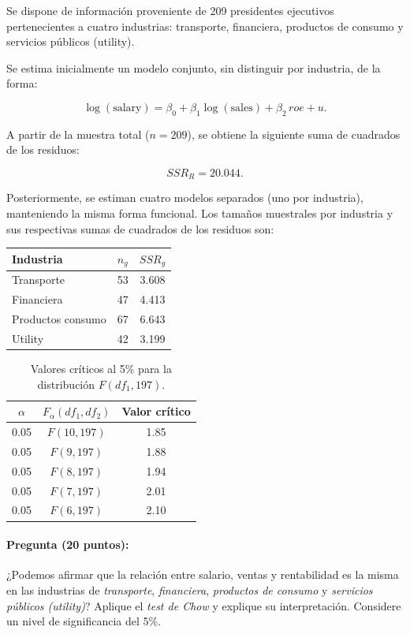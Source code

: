 \documentclass[10pt,a4paper]{article}
\begin{document}
\begin{enumerate}
Se dispone de información proveniente de 209 presidentes ejecutivos pertenecientes a cuatro 
industrias: transporte, financiera, productos de consumo y servicios públicos (utility).

Se estima inicialmente un modelo conjunto, sin distinguir por industria, de la forma:

\[
\log(\text{salary}) = \beta_0 + \beta_1 \log(\text{sales}) + \beta_2 \, roe + u.
\]

A partir de la muestra total ($n = 209$), se obtiene la siguiente suma de cuadrados de los residuos:

\[
SSR_R = 20.044.
\]

Posteriormente, se estiman cuatro modelos separados (uno por industria), manteniendo la misma 
forma funcional. Los tamaños muestrales por industria y sus respectivas sumas de cuadrados de los 
residuos son:

\begin{center}
\begin{tabular}{lcc}
\toprule
\textbf{Industria} & $n_g$ & $SSR_g$ \\
\midrule
Transporte        & 53 & 3.608 \\
Financiera        & 47 & 4.413 \\
Productos consumo & 67 & 6.643 \\
Utility           & 42 & 3.199 \\

\bottomrule
\end{tabular}
\end{center}

\vspace{0.5cm}

\begin{table}[h!]
\centering
\begin{tabular}{ccc}
\hline
$\alpha$ & $F_{\alpha}(df_1, df_2)$ & Valor crítico \\ \hline
0.05 & $F(10,197)$ & 1.85 \\
0.05 & $F(9,197)$  & 1.88 \\
0.05 & $F(8,197)$  & 1.94 \\
0.05 & $F(7,197)$  & 2.01 \\
0.05 & $F(6,197)$  & 2.10 \\ \hline
\end{tabular}
\caption{Valores críticos al 5\% para la distribución $F(df_1,197)$.}
\end{table}

\paragraph{Pregunta (20 puntos):}
¿Podemos afirmar que la relación entre salario, ventas y rentabilidad es la misma en las 
industrias de \textit{transporte}, \textit{financiera}, \textit{productos de consumo} y 
\textit{servicios públicos (utility)}? 
Aplique el \textit{test de Chow} y explique 
su interpretación. Considere un nivel de significancia del 5\%.


\end{enumerate}
\end{document}
